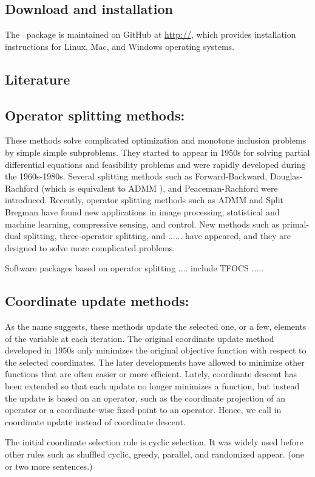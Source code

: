 \subsection{Download and installation}
The \pkg~package is maintained on GitHub at \url{http://}, which provides installation instructions for Linux, Mac, and Windows operating systems. 
\subsection{Literature}
\subsection*{Operator splitting methods:}  These methods solve complicated optimization and monotone inclusion problems by simple simple subproblems. They started to appear in 1950s for  solving partial differential equations and feasibility problems and were rapidly developed during the 1960s-1980s. Several splitting methods such as Forward-Backward, Douglas-Rachford  (which is equivalent to ADMM \cite{?,?}), and Peaceman-Rachford were introduced. Recently,
operator splitting methods such as ADMM and Split Bregman have found new applications in image processing,
statistical and machine learning, compressive sensing, and control. New methods such as primal-dual splitting, three-operator splitting, and ...... have appeared, and they are designed to  solve more complicated problems.

Software packages based on operator splitting  .... include TFOCS .....

\subsection*{Coordinate update methods:}
As the name suggests, these methods update the selected one, or a few, elements of the variable at each iteration. The original  coordinate update method developed in 1950s only minimizes the original objective function with respect to the selected coordinates. The later developments have allowed to minimize other functions that are often easier or more efficient. Lately, coordinate descent has been extended so that each update no longer minimizes a function, but instead the update is based on an operator, such as the coordinate projection of an operator or a coordinate-wise fixed-point to an operator. Hence, we call in coordinate update instead of coordinate descent. 

The initial coordinate selection rule  is   cyclic selection. It was widely used before other rules such as shuffled cyclic, greedy, parallel, and randomized appear. (one or two more sentences.)

